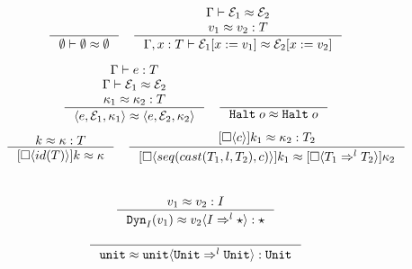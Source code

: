 \documentclass[acmsmall,review]{acmart}\settopmatter{printfolios=true,printccs=false,printacmref=false}
\newcommand{\judgetype}[3]{#1 \vdash #2 : #3}
\newcommand{\sOOhalt}[1]{\mathtt{Halt} \; #1}
\newcommand{\TOOdyn}[0]{\star}
\newcommand{\POOunit}[0]{\mathtt{Unit}}
\newcommand{\cOOcast}[3]{#1 \Rightarrow^{#2} #3}
\newcommand{\vOOcast}[2]{#1\langle#2\rangle}
\newcommand{\vOOtt}[0]{\mathtt{unit}}
\newcommand{\kOOcast}[2]{
  [\square \langle #1 \rangle]#2}
\newcommand{\hcvOOinj}[2]{\mathtt{Dyn}_{#1}(#2)}
\newcommand{\hcvOOtt}[0]{\mathtt{unit}}
\newcommand{\ineffCEKD}{\ensuremath{\mathcal{D}}}
\newcommand{\effCEK}[1]{\ensuremath{\mathcal{S}(#1)}}
\begin{document}
\begin{figure}

\begin{gather*}
\inference{
}{
	\emptyset \vdash \emptyset \approx \emptyset
}
\quad
\inference{
	\Gamma \vdash \mathcal{E}_1 \approx \mathcal{E}_2 \\
	v_1 \approx v_2 : T
}{
	\Gamma , x : T \vdash 
		\mathcal{E}_1 [ x := v_1 ] \approx \mathcal{E}_2 [ x := v_2 ]
}
\end{gather*}

  \begin{gather*}
    \inference{
    	\judgetype{\Gamma}{e}{T} \\
    	\Gamma \vdash \mathcal{E}_1 \approx \mathcal{E}_2 \\
   		\kappa_1 \approx \kappa_2 : T
   	}{
   		\langle e, \mathcal{E}_1, \kappa_1 \rangle 
   		\approx
		\langle e, \mathcal{E}_2, \kappa_2 \rangle
	}
    \quad
    \inference{}
              {\sOOhalt{o} \approx \sOOhalt{o}} \\
  \end{gather*} 
  \begin{gather*}
  \inference{
    k \approx \kappa : T
  }{
    \kOOcast{id(T)}{k} \approx \kappa
  }
  \quad
  \inference{
    \kOOcast{c}{k_1} \approx \kappa_2 : T_2
  }{
    \kOOcast{seq(cast(T_1,l,T_2),c)}{k_1} \approx 
    \kOOcast{\cOOcast{T_1}{l}{T_2}}{\kappa_2}
  }
\\
  \end{gather*}
\\  
  \begin{gather*}
  \inference{
    v_1 \approx v_2 : I
  }{
    \hcvOOinj{I}{v_1} \approx \vOOcast{v_2}{\cOOcast{I}{l}{\TOOdyn}}
    : \TOOdyn
  }
  \\[1ex]
  \inference{}{
    \hcvOOtt \approx \vOOcast{\vOOtt}{\cOOcast{\POOunit}{l}{\POOunit}}
    : \POOunit
  }
  \\[1ex]

\end{gather*}
\end{figure}
\end{document}
